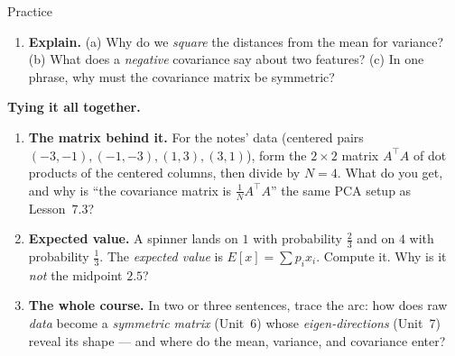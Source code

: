\documentclass[10pt]{article}
\begin{document}
\begin{notesbox}{Practice}
\begin{enumerate}[leftmargin=1.9em, itemsep=11pt]
  \item \textbf{Explain.} (a) Why do we \emph{square} the distances from the mean for variance? (b) What does a
        \emph{negative} covariance say about two features? (c) In one phrase, why must the covariance matrix be
        symmetric? 
\end{enumerate}
\end{notesbox}

\begin{extensionbox}
\textbf{Tying it all together.}
\begin{enumerate}[label=(\alph*), leftmargin=1.8em, itemsep=5pt]
  \item \textbf{The matrix behind it.} For the notes' data (centered pairs $(-3,-1),(-1,-3),(1,3),(3,1)$), form
        the $2\times2$ matrix $A^{\top}\!A$ of dot products of the centered columns, then divide by $N=4$. What
        do you get, and why is ``the covariance matrix is $\frac1N A^{\top}\!A$'' the same PCA setup as Lesson~7.3?
  \item \textbf{Expected value.} A spinner lands on $1$ with probability $\tfrac23$ and on $4$ with probability
        $\tfrac13$. The \emph{expected value} is $E[x]=\sum p_i x_i$. Compute it. Why is it \emph{not} the
        midpoint $2.5$?
  \item \textbf{The whole course.} In two or three sentences, trace the arc: how does raw \emph{data} become a
        \emph{symmetric matrix} (Unit~6) whose \emph{eigen-directions} (Unit~7) reveal its shape --- and where do
        the mean, variance, and covariance enter?
\end{enumerate}

\end{extensionbox}
\end{document}
